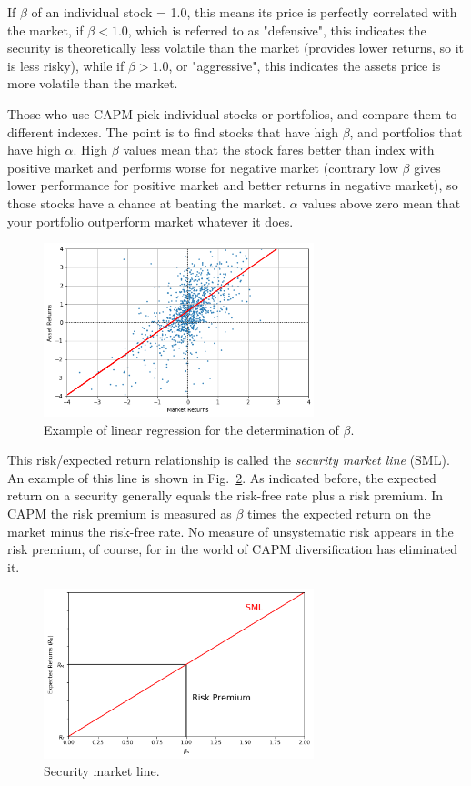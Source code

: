 If $\beta$ of an individual stock = 1.0, this means its price is perfectly correlated with the market, if $\beta < 1.0$, which is referred to as "defensive", this indicates the security is theoretically less volatile than the market (provides lower returns, so it is less risky), while if $\beta > 1.0$, or "aggressive", this indicates the assets price is more volatile than the market.

Those who use CAPM pick individual stocks or portfolios, and compare them to different indexes. The point is to find stocks that have high $\beta$, and portfolios that have high $\alpha$. High $\beta$ values mean that the stock fares better than index with positive market and performs worse for negative market (contrary low $\beta$ gives lower performance for positive market and better returns in negative market), so those stocks have a chance at beating the market. $\alpha$ values above zero mean that your portfolio outperform market whatever it does.

\begin{figure}[htb]
	\centering
	\includegraphics[width=0.7\textwidth]{figures/linear_regression}
	\caption{Example of linear regression for the determination of $\beta$.}
	\label{fig:linear_regression}
\end{figure}

This risk/expected return relationship is called the \emph{security market line} (SML). An example of this line is shown in Fig.~\ref{fig:sel}. As indicated before, the expected return on a security generally equals the risk-free rate plus a risk premium. In CAPM the risk premium is measured as $\beta$ times the expected return on the market minus the risk-free rate. No measure of unsystematic risk appears in the risk premium, of course, for in the world of CAPM diversification has eliminated it.

\begin{figure}[htb]
	\centering
	\includegraphics[width=0.7\textwidth]{figures/sel}
	\caption{Security market line.}
	\label{fig:sel}
\end{figure}

